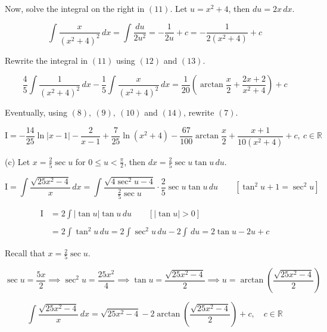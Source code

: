 \documentclass{article}
\begin{document}
\hfill

\noindent Now, solve the integral on the right in $(11)$. Let $u=x^2+4$, then $du=2x\,dx$.

\begin{equation}\int\frac x{\left(x^2+4\right)^2}\,dx=\int\frac{du}{2u^2}=-\frac1{2u}+c=-\frac1{2\left(x^2+4\right)}+c\end{equation}

\hfill

\noindent Rewrite the integral in $(11)$ using $(12)$ and $(13)$.

\begin{equation}\frac45\int\frac1{\left(x^2+4\right)^2}\,dx-\frac15\int\frac x{\left(x^2+4\right)^2}\,dx=\frac1{20}\left(\arctan\frac x2+\frac{2x+2}{x^2+4}\right)+c\end{equation}

\hfill

\noindent Eventually, using $(8),\:(9),\:(10)$ and $(14)$, rewrite $(7)$.

\[\mathrm{I}=\boxed{-\frac{14}{25}\ln\left|x-1\right|-\frac2{x-1}+\frac7{25}\ln\left(x^2+4\right)-\frac{67}{100}\arctan\frac x2+\frac{x+1}{10\left(x^2+4\right)}+c,\ c\in\mathbb{R}}\]

\hfill

\noindent (c) Let $\displaystyle x=\frac25\sec u$ for $\displaystyle 0\leq u<\frac\pi2$, then $dx=\displaystyle\frac25\sec u\tan u\,du$.

\[\mathrm{I}=\int\frac{\sqrt{25x^2-4}}{x}\,dx=\int\frac{\sqrt{4\sec^2u-4}}{\frac25\sec u}\cdot\frac25\sec u\tan u\,du\qquad\left[\tan^2u+1=\sec^2u\right]\]

\newpage

\begin{align*}\mathrm{I}&=2\int\left|\tan u\right|\tan  u\,du\qquad\left[\left|\tan u\right|>0\right]\\\\&=2\int\tan^2u\,du=2\int\sec^2u\,du-2\int\,du=2\tan u-2u+c\end{align*}

\noindent Recall that $\displaystyle x=\frac25\sec u$.

\[\sec u=\frac{5x}2\implies\sec^2u=\frac{25x^2}4\implies\tan u=\frac{\sqrt{25x^2-4}}2\implies u=\arctan\left(\frac{\sqrt{25x^2-4}}2\right)\]

\[\int\frac{\sqrt{25x^2-4}}{x}\,dx=\boxed{\sqrt{25x^2-4}-2\arctan\left(\frac{\sqrt{25x^2-4}}2\right)+c,\quad c\in\mathbb{R}}\]

\hfill
\end{document}
